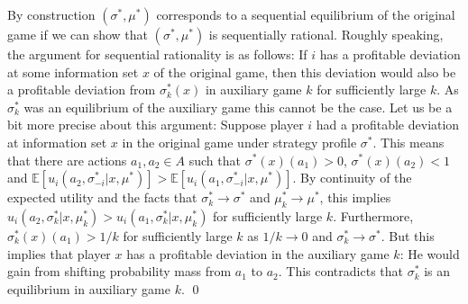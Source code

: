\documentclass[a4paper,11pt]{article}
\begin{document}
By construction $(\sigma^*,\mu^*)$ corresponds to a sequential equilibrium of the original game if we can show that $(\sigma^*,\mu^*)$ is sequentially rational. Roughly speaking, the argument for sequential rationality is as follows: If $i$ has a profitable deviation at some information set $x$ of the original game, then this deviation would also be a profitable deviation from $\sigma_k^*(x)$ in auxiliary game $k$ for sufficiently large $k$. As $\sigma_k^*$ was an equilibrium of the auxiliary game this cannot be the case. Let us be a bit more precise about this argument: Suppose player $i$ had a profitable deviation at information set $x$ in the original game under strategy profile $\sigma^*$. This means that there are actions $a_1,a_2\in A$ such that $\sigma^*(x)(a_1)>0$, $\sigma^*(x)(a_2)<1$ and $\mathbb{E}[u_i(a_2,\sigma^*_{-i}|x,\mu^*)]>\mathbb{E}[u_i(a_1,\sigma^*_{-i}|x,\mu^*)]$. By continuity of the expected utility and the facts that $\sigma_k^*\rightarrow \sigma^*$ and $\mu_k^*\rightarrow\mu^*$, this implies $u_i(a_2,\sigma^*_k|x,\mu^*_k)>u_i(a_1,\sigma^*_k|x,\mu^*_k)$ for sufficiently large $k$. Furthermore, $\sigma_k^*(x)(a_1)>1/k$ for sufficiently large $k$ as $1/k\rightarrow 0$ and $\sigma^*_k\rightarrow\sigma^*$. But this implies that player $x$ has a profitable deviation in the auxiliary game $k$: He would gain from shifting probability mass from $a_1$ to $a_2$. This contradicts that $\sigma_k^*$ is an equilibrium in auxiliary game $k$.
\qed 


\newpage



\end{document}
